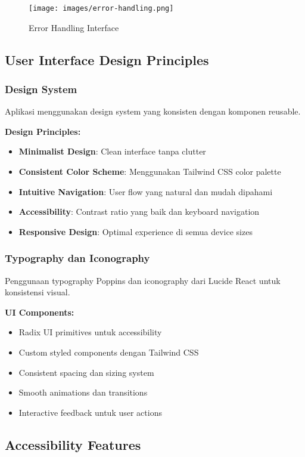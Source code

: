 \begin{figure}[H]
\centering
\texttt{[image: images/error-handling.png]}
\caption{Error Handling Interface}
\label{fig:error-handling}
\end{figure}

\subsection{User Interface Design Principles}

\subsubsection{Design System}
Aplikasi menggunakan design system yang konsisten dengan komponen reusable.

\textbf{Design Principles:}
\begin{itemize}
\item \textbf{Minimalist Design}: Clean interface tanpa clutter
\item \textbf{Consistent Color Scheme}: Menggunakan Tailwind CSS color palette
\item \textbf{Intuitive Navigation}: User flow yang natural dan mudah dipahami
\item \textbf{Accessibility}: Contrast ratio yang baik dan keyboard navigation
\item \textbf{Responsive Design}: Optimal experience di semua device sizes
\end{itemize}

\subsubsection{Typography dan Iconography}
Penggunaan typography Poppins dan iconography dari Lucide React untuk konsistensi visual.

\textbf{UI Components:}
\begin{itemize}
\item Radix UI primitives untuk accessibility
\item Custom styled components dengan Tailwind CSS
\item Consistent spacing dan sizing system
\item Smooth animations dan transitions
\item Interactive feedback untuk user actions
\end{itemize}

\subsection{Accessibility Features}

